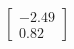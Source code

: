 \documentclass[preview]{standalone}
\begin{document}
\begin{align*}
\begin{bmatrix} -2.49 \\ 0.82 \end{bmatrix}
\end{align*}
\end{document}
